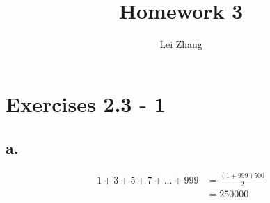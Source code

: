 \documentclass{article}
\title{Homework 3}
\author{Lei Zhang}
\begin{document}
\maketitle

\section{Exercises 2.3 - 1}

\subsection{a.}

\begin{align*}
1+ 3 + 5 + 7 + . . . + 999 &= \frac{(1+999)500}{2}\\
&= 250000
\end{align*}
\end{document}

